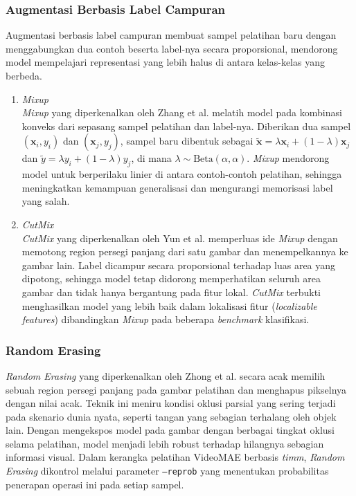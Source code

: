 \subsubsection{Augmentasi Berbasis Label Campuran} \label{II.Augmentasi.Campuran}
Augmentasi berbasis label campuran membuat sampel pelatihan baru dengan menggabungkan dua contoh beserta label-nya secara proporsional, mendorong model mempelajari representasi yang lebih halus di antara kelas-kelas yang berbeda.

\begin{enumerate}
  \item \textit{Mixup}\\
  \textit{Mixup} yang diperkenalkan oleh Zhang et al. \cite{Zhang2018mixup} melatih model pada kombinasi konveks dari sepasang sampel pelatihan dan label-nya. Diberikan dua sampel $(\mathbf{x}_i, y_i)$ dan $(\mathbf{x}_j, y_j)$, sampel baru dibentuk sebagai $\tilde{\mathbf{x}} = \lambda \mathbf{x}_i + (1-\lambda)\mathbf{x}_j$ dan $\tilde{y} = \lambda y_i + (1-\lambda)y_j$, di mana $\lambda \sim \mathrm{Beta}(\alpha, \alpha)$. \textit{Mixup} mendorong model untuk berperilaku linier di antara contoh-contoh pelatihan, sehingga meningkatkan kemampuan generalisasi dan mengurangi memorisasi label yang salah.

  \item \textit{CutMix}\\
  \textit{CutMix} yang diperkenalkan oleh Yun et al. \cite{Yun2019cutmix} memperluas ide \textit{Mixup} dengan memotong region persegi panjang dari satu gambar dan menempelkannya ke gambar lain. Label dicampur secara proporsional terhadap luas area yang dipotong, sehingga model tetap didorong memperhatikan seluruh area gambar dan tidak hanya bergantung pada fitur lokal. \textit{CutMix} terbukti menghasilkan model yang lebih baik dalam lokalisasi fitur (\textit{localizable features}) dibandingkan \textit{Mixup} pada beberapa \textit{benchmark} klasifikasi.
\end{enumerate}

\subsubsection{Random Erasing} \label{II.Augmentasi.Erasing}
\textit{Random Erasing} yang diperkenalkan oleh Zhong et al. \cite{Zhong2020erasing} secara acak memilih sebuah region persegi panjang pada gambar pelatihan dan menghapus pikselnya dengan nilai acak. Teknik ini meniru kondisi oklusi parsial yang sering terjadi pada skenario dunia nyata, seperti tangan yang sebagian terhalang oleh objek lain. Dengan mengekspos model pada gambar dengan berbagai tingkat oklusi selama pelatihan, model menjadi lebih robust terhadap hilangnya sebagian informasi visual. Dalam kerangka pelatihan VideoMAE berbasis \textit{timm}, \textit{Random Erasing} dikontrol melalui parameter \texttt{--reprob} yang menentukan probabilitas penerapan operasi ini pada setiap sampel.\par

